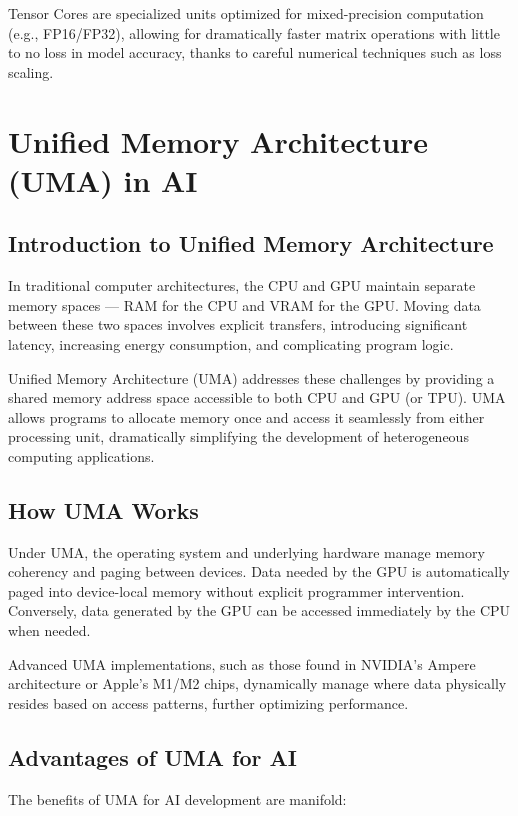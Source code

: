\documentclass[openany]{book}
\begin{document}
Tensor Cores are specialized units optimized for mixed-precision computation 
(e.g., FP16/FP32), allowing for dramatically faster matrix operations with 
little to no loss in model accuracy, thanks to careful numerical techniques such 
as loss scaling.

\section{Unified Memory Architecture (UMA) in AI}

\subsection{Introduction to Unified Memory Architecture}
In traditional computer architectures, the CPU and GPU maintain separate memory 
spaces — RAM for the CPU and VRAM for the GPU. Moving data between these two 
spaces involves explicit transfers, introducing significant latency, increasing 
energy consumption, and complicating program logic.

Unified Memory Architecture (UMA) addresses these challenges by providing a 
shared memory address space accessible to both CPU and GPU (or TPU). UMA allows 
programs to allocate memory once and access it seamlessly from either processing 
unit, dramatically simplifying the development of heterogeneous computing 
applications.

\subsection{How UMA Works}
Under UMA, the operating system and underlying hardware manage memory coherency 
and paging between devices. Data needed by the GPU is automatically paged into 
device-local memory without explicit programmer intervention. Conversely, data 
generated by the GPU can be accessed immediately by the CPU when needed.

Advanced UMA implementations, such as those found in NVIDIA's Ampere 
architecture or Apple's M1/M2 chips, dynamically manage where data physically 
resides based on access patterns, further optimizing performance.

\subsection{Advantages of UMA for AI}
The benefits of UMA for AI development are manifold:
\end{document}
